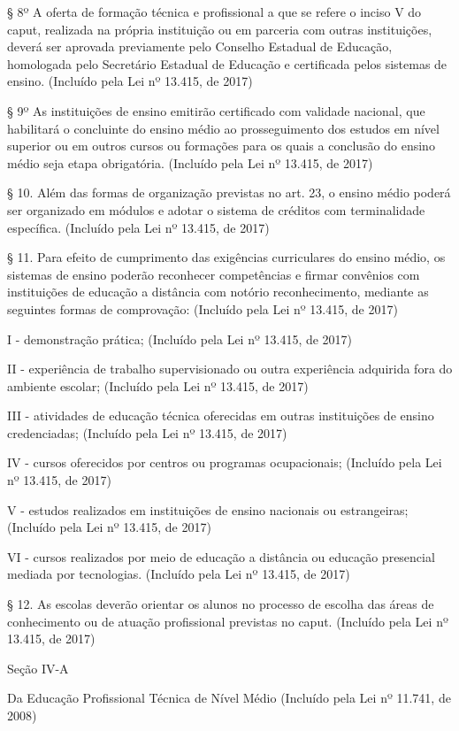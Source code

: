 \documentclass[
]{book}
\begin{document}
§ 8º A oferta de formação técnica e profissional a que se refere o inciso V do caput, realizada na própria instituição ou em parceria com outras instituições, deverá ser aprovada previamente pelo Conselho Estadual de Educação, homologada pelo Secretário Estadual de Educação e certificada pelos sistemas de ensino. (Incluído pela Lei nº 13.415, de 2017)

§ 9º As instituições de ensino emitirão certificado com validade nacional, que habilitará o concluinte do ensino médio ao prosseguimento dos estudos em nível superior ou em outros cursos ou formações para os quais a conclusão do ensino médio seja etapa obrigatória. (Incluído pela Lei nº 13.415, de 2017)

§ 10. Além das formas de organização previstas no art. 23, o ensino médio poderá ser organizado em módulos e adotar o sistema de créditos com terminalidade específica. (Incluído pela Lei nº 13.415, de 2017)

§ 11. Para efeito de cumprimento das exigências curriculares do ensino médio, os sistemas de ensino poderão reconhecer competências e firmar convênios com instituições de educação a distância com notório reconhecimento, mediante as seguintes formas de comprovação: (Incluído pela Lei nº 13.415, de 2017)

I - demonstração prática; (Incluído pela Lei nº 13.415, de 2017)

II - experiência de trabalho supervisionado ou outra experiência adquirida fora do ambiente escolar; (Incluído pela Lei nº 13.415, de 2017)

III - atividades de educação técnica oferecidas em outras instituições de ensino credenciadas; (Incluído pela Lei nº 13.415, de 2017)

IV - cursos oferecidos por centros ou programas ocupacionais; (Incluído pela Lei nº 13.415, de 2017)

V - estudos realizados em instituições de ensino nacionais ou estrangeiras; (Incluído pela Lei nº 13.415, de 2017)

VI - cursos realizados por meio de educação a distância ou educação presencial mediada por tecnologias. (Incluído pela Lei nº 13.415, de 2017)

§ 12. As escolas deverão orientar os alunos no processo de escolha das áreas de conhecimento ou de atuação profissional previstas no caput. (Incluído pela Lei nº 13.415, de 2017)

Seção IV-A

Da Educação Profissional Técnica de Nível Médio
(Incluído pela Lei nº 11.741, de 2008)
\end{document}
